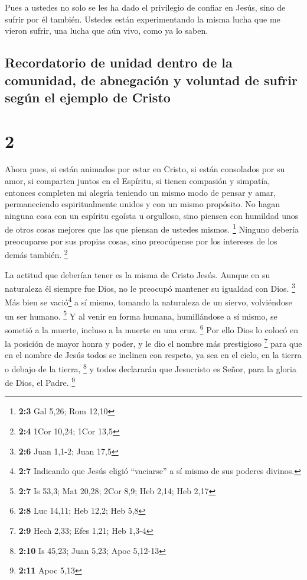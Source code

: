  Pues a ustedes no solo se les ha dado el privilegio de
confiar en Jesús, sino de sufrir por él también.  Ustedes
están experimentando la misma lucha que me vieron sufrir, una lucha que
aún vivo, como ya lo saben.

\hypertarget{recordatorio-de-unidad-dentro-de-la-comunidad-de-abnegaciuxf3n-y-voluntad-de-sufrir-seguxfan-el-ejemplo-de-cristo}{%
\subsection{Recordatorio de unidad dentro de la comunidad, de abnegación
y voluntad de sufrir según el ejemplo de
Cristo}\label{recordatorio-de-unidad-dentro-de-la-comunidad-de-abnegaciuxf3n-y-voluntad-de-sufrir-seguxfan-el-ejemplo-de-cristo}}

\hypertarget{section-1}{%
\section{2}\label{section-1}}

 Ahora pues, si están animados por estar en Cristo, si
están consolados por su amor, si comparten juntos en el Espíritu, si
tienen compasión y simpatía,  entonces completen mi
alegría teniendo un mismo modo de pensar y amar, permaneciendo
espiritualmente unidos y con un mismo propósito.  No hagan
ninguna cosa con un espíritu egoísta u orgulloso, sino piensen con
humildad unos de otros cosas mejores que las que piensan de ustedes
mismos. \footnote{\textbf{2:3} Gal 5,26; Rom 12,10} 
Ninguno debería preocuparse por sus propias cosas, sino preocúpense por
los intereses de los demás también. \footnote{\textbf{2:4} 1Cor 10,24;
  1Cor 13,5}

 La actitud que deberían tener es la misma de Cristo
Jesús.  Aunque en su naturaleza él siempre fue Dios, no le
preocupó mantener su igualdad con Dios. \footnote{\textbf{2:6} Juan
  1,1-2; Juan 17,5}  Más bien se vació\footnote{\textbf{2:7}
  Indicando que Jesús eligió ``vaciarse'' a sí mismo de sus poderes
  divinos.} a sí mismo, tomando la naturaleza de un siervo, volviéndose
un ser humano. \footnote{\textbf{2:7} Is 53,3; Mat 20,28; 2Cor 8,9; Heb
  2,14; Heb 2,17}  Y al venir en forma humana,
humillándose a sí mismo, se sometió a la muerte, incluso a la muerte en
una cruz. \footnote{\textbf{2:8} Luc 14,11; Heb 12,2; Heb 5,8}
 Por ello Dios lo colocó en la posición de mayor honra y
poder, y le dio el nombre más prestigioso \footnote{\textbf{2:9} Hech
  2,33; Efes 1,21; Heb 1,3-4}  para que en el nombre de
Jesús todos se inclinen con respeto, ya sea en el cielo, en la tierra o
debajo de la tierra, \footnote{\textbf{2:10} Is 45,23; Juan 5,23; Apoc
  5,12-13}  y todos declararán que Jesucristo es Señor,
para la gloria de Dios, el Padre. \footnote{\textbf{2:11} Apoc 5,13}


